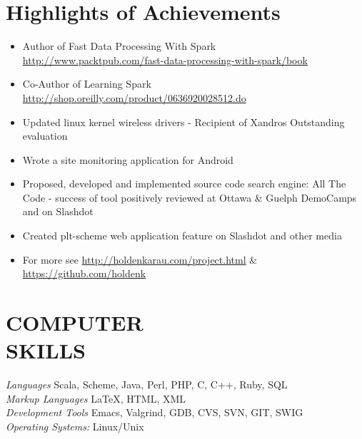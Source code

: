 \documentclass[10pt,line,margin=0.1]{newsres}
\begin{document}
\address{San Francisco, CA, USA}
\address{E-mail: holden@pigscanfly.ca, Cell: (425) 233-8271}
 
\begin{resume}
  
 \section{Highlights of Achievements}
\begin{itemize}  \itemsep -2pt %
\item{Author of  Fast Data Processing With Spark \\ \url{http://www.packtpub.com/fast-data-processing-with-spark/book}}
\item{Co-Author of Learning Spark \\ \url{http://shop.oreilly.com/product/0636920028512.do}}
\item{Updated linux kernel wireless drivers - Recipient of Xandros Outstanding evaluation}
\item{Wrote a site monitoring application for Android}
\item{Proposed, developed and implemented source code search engine: All The Code - success of tool positively reviewed at Ottawa \& Guelph DemoCamps and on Slashdot}
\item{Created plt-scheme web application feature on Slashdot and other media}
\item{For more see \url{http://holdenkarau.com/project.html} \& \url{https://github.com/holdenk}}
\end{itemize}
\section{COMPUTER \\ SKILLS} {\sl Languages} Scala, Scheme, Java, Perl, PHP, C, C++, Ruby, SQL \\ %
                {\sl Markup Languages} \LaTeX , HTML, XML \\
                {\sl Development Tools} Emacs, Valgrind, GDB, CVS, SVN, GIT, SWIG \\
                {\sl Operating Systems:}  Linux/Unix \\
 

\end{resume}
\end{document}
